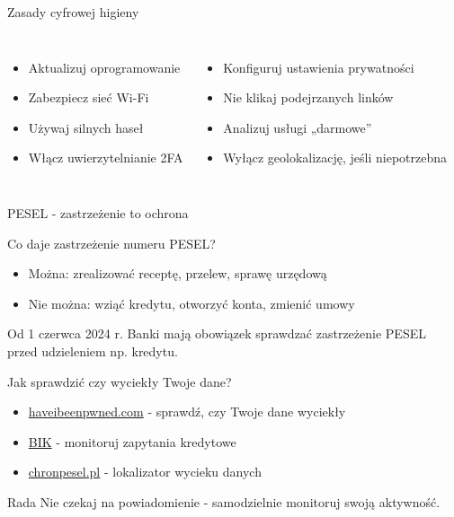 \begin{frame}{Zasady cyfrowej higieny}
\begin{columns}[c]
    \begin{itemize}
        \item Aktualizuj oprogramowanie
        \item Zabezpiecz sieć Wi-Fi
        \item Używaj silnych haseł
        \item Włącz uwierzytelnianie 2FA
    \end{itemize}
    \begin{itemize}
        \item Konfiguruj ustawienia prywatności
        \item Nie klikaj podejrzanych linków
        \item Analizuj usługi „darmowe”
        \item Wyłącz geolokalizację, jeśli niepotrzebna \cite{PROTECTION}
    \end{itemize}
\end{columns}
\end{frame}

\begin{frame}{PESEL - zastrzeżenie to ochrona}
\begin{block}{Co daje zastrzeżenie numeru PESEL?}
\begin{itemize}
    \item Można: zrealizować receptę, przelew, sprawę urzędową
    \item Nie można: wziąć kredytu, otworzyć konta, zmienić umowy
\end{itemize}
\end{block}
\pause
\begin{exampleblock}{Od 1 czerwca 2024 r.}
Banki mają obowiązek sprawdzać zastrzeżenie PESEL przed udzieleniem np. kredytu. \cite{pesel}
\end{exampleblock}
\end{frame}

\begin{frame}{Jak sprawdzić czy wyciekły Twoje dane?}
\begin{itemize}
    \item \href{https://haveibeenpwned.com}{haveibeenpwned.com} - sprawdź, czy Twoje dane wyciekły
    \item \href{https://www.bik.pl/}{BIK} - monitoruj zapytania kredytowe
    \item \href{https://chronpesel.pl/}{chronpesel.pl} - lokalizator wycieku danych
\end{itemize}
\begin{alertblock}{Rada}
Nie czekaj na powiadomienie - samodzielnie monitoruj swoją aktywność.
\end{alertblock}
\end{frame}

